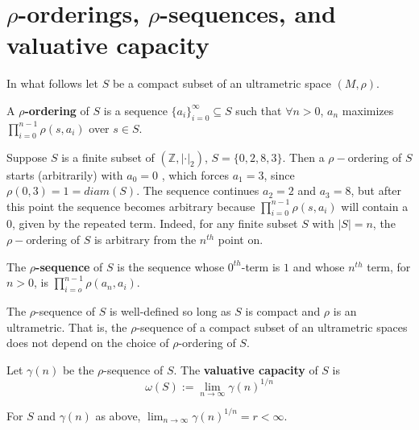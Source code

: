 \newpage
\section*{$\rho$-orderings, $\rho$-sequences, and valuative capacity}

In what follows let $S$ be a compact subset of an ultrametric space $(M,\rho)$.

\begin{definition}
	\cite{kj} A \textbf{$\rho$-ordering} of $S$ is a sequence $\{a_i\}_{i=0}^\infty \subseteq S$ such that $\forall n > 0$, $a_n$ maximizes $\prod_{i=0}^{n-1} \rho(s,a_i)$ over $s \in S$. 
\end{definition}

\begin{example}
Suppose $S$ is a finite subset of $(\mathbb{Z}, \lvert \cdot \rvert_2)$, $S=\{0,2,8,3\}$. Then a $\rho-$ordering of $S$ starts (arbitrarily) with $a_0=0$ , which forces $a_1=3$, since $\rho(0,3)=1=diam(S)$. The sequence continues $a_2=2$ and $a_3=8$, but after this point the sequence becomes arbitrary because  $\prod_{i=0}^{n-1} \rho(s,a_i)$ will contain a $0$, given by the repeated term. Indeed, for any finite subset $S$ with $\lvert S \rvert = n$, the $\rho-$ordering of $S$ is arbitrary from the $n^{th}$ point on. 
\end{example}

\begin{definition}
	\cite{kj} The \textbf{$\rho$-sequence} of $S$ is the sequence whose $0^{th}$-term is $1$ and whose $n^{th}$ term, for $n >0$, is $\prod_{i=o}^{n-1} \rho(a_n,a_i)$.
\end{definition}

\begin{proposition}
	\cite{kj} The $\rho$-sequence of $S$ is well-defined so long as $S$ is compact and $\rho$ is an ultrametric. That is, the $\rho$-sequence of a compact subset of an ultrametric spaces does not depend on the choice of $\rho$-ordering of $S$.
\end{proposition}

\begin{definition}
	\cite{kj}  Let $\gamma(n)$ be the $\rho$-sequence of $S$. The \textbf{valuative capacity} of $S$ is \[\omega(S)
	:= \lim_{n\to\infty} \gamma(n)^{1/n}\]  
\end{definition}


\begin{proposition}
	\cite{kj} For $S$ and $\gamma(n)$ as above,  $\lim_{n\to\infty} \gamma(n)^{1/n} = r < \infty$. 
\end{proposition}


